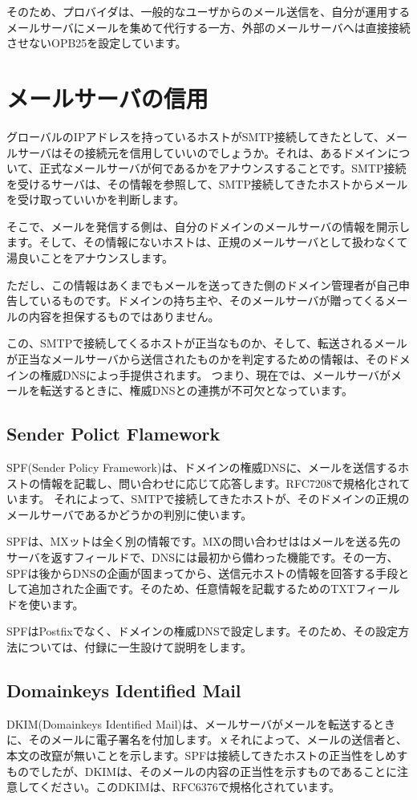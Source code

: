 {そのため、プロバイダは、一般的なユーザからのメール送信を、自分が運用するメールサーバにメールを集めて代行する一方、外部のメールサーバへは直接接続させないOPB25を設定しています。

\section{メールサーバの信用}

グローバルのIPアドレスを持っているホストがSMTP接続してきたとして、メールサーバはその接続元を信用していいのでしょうか。それは、あるドメインについて、正式なメールサーバが何であるかをアナウンスすることです。SMTP接続を受けるサーバは、その情報を参照して、SMTP接続してきたホストからメールを受け取っていいかを判断します。

そこで、メールを発信する側は、自分のドメインのメールサーバの情報を開示します。そして、その情報にないホストは、正規のメールサーバとして扱わなくて湯良いことをアナウンスします。

ただし、この情報はあくまでもメールを送ってきた側のドメイン管理者が自己申告しているものです。ドメインの持ち主や、そのメールサーバが贈ってくるメールの内容を担保するものではありません。

この、SMTPで接続してくるホストが正当なものか、そして、転送されるメールが正当なメールサーバから送信されたものかを判定するための情報は、そのドメインの権威DNSによっ手提供されます。
つまり、現在では、メールサーバがメールを転送するときに、権威DNSとの連携が不可欠となっています。

\subsection{Sender Polict Flamework}
SPF(Sender Policy Framework)は、ドメインの権威DNSに、メールを送信するホストの情報を記載し、問い合わせに応じて応答します。RFC7208で規格化されています。
それによって、SMTPで接続してきたホストが、そのドメインの正規のメールサーバであるかどうかの判別に使います。

SPFは、MXットは全く別の情報です。MXの問い合わせははメールを送る先のサーバを返すフィールドで、DNSには最初から備わった機能です。その一方、SPFは後からDNSの企画が固まってから、送信元ホストの情報を回答する手段として追加された企画です。そのため、任意情報を記載するためのTXTフィールドを使います。

SPFはPostfixでなく、ドメインの権威DNSで設定します。そのため、その設定方法については、付録に一生設けて説明をします。

\subsection{Domainkeys Identified Mail}
DKIM(Domainkeys Identified Mail)は、メールサーバがメールを転送するときに、そのメールに電子署名を付加します。ｘそれによって、メールの送信者と、本文の改竄が無いことを示します。SPFは接続してきたホストの正当性をしめすものでしたが、DKIMは、そのメールの内容の正当性を示すものであることに注意してください。このDKIMは、RFC6376で規格化されています。

}
